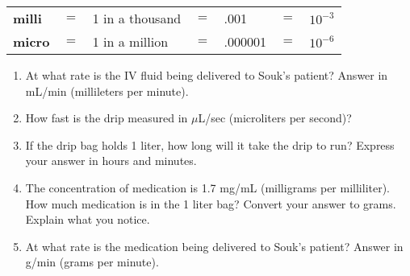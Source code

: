 \begin{enumerate}
\begin{center}
\begin{tabular} {lclclcl} 
\textbf{milli} &$=$&1 in a thousand &$=$&.001&$=$&$10^{-3}$\\
\textbf{micro} &$=$&1 in a million &$=$&.000001&$=$&$10^{-6}$\\
\end{tabular}
\end{center}
\begin{enumerate}
\item At what rate is the IV fluid being delivered to Souk's patient?  Answer in mL/min (millileters per minute). \vfill
\item How fast is the drip measured in $\mu$L/sec (microliters per second)? \vfill
\item If the drip bag holds 1 liter, how long will it take the drip to run?  Express your answer in hours and minutes.\vfill
\item The concentration of medication is 1.7 mg/mL (milligrams per milliliter).  How much medication is in the 1 liter bag?  Convert your answer to grams.  Explain what you notice.\vfill
\item At what rate is the medication being delivered to Souk's patient?  Answer in g/min (grams per minute).\vfill
\end{enumerate}

\end{enumerate} 




